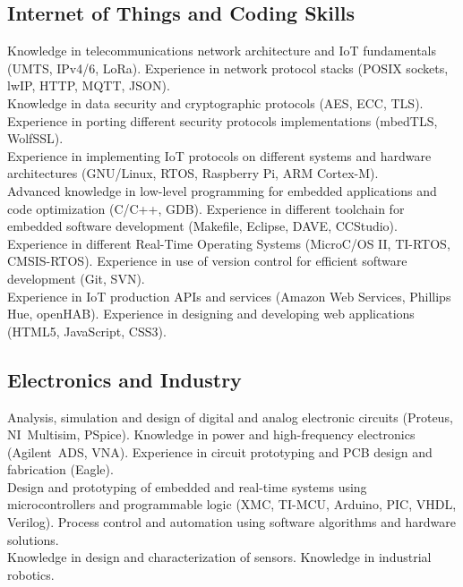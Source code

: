 \documentclass[11pt,a4paper,sans,spanish]{moderncv}
\begin{document}
\subsection{Internet of Things and Coding Skills}
Knowledge in telecommunications network architecture and IoT fundamentals (UMTS, IPv4/6, LoRa). Experience in network protocol stacks (POSIX sockets, lwIP, HTTP, MQTT, JSON).
\protect\\[0.4em]
Knowledge in data security and cryptographic protocols (AES, ECC, TLS). Experience in porting different security protocols implementations (mbedTLS, WolfSSL).
\protect\\[0.4em]
Experience in implementing IoT protocols on different systems and hardware architectures (GNU/Linux, RTOS, Raspberry Pi, ARM Cortex-M).
\protect\\[0.4em]
Advanced knowledge in low-level programming for embedded applications and code optimization (C/C++, GDB). Experience in different toolchain for embedded software development (Makefile, Eclipse, DAVE, CCStudio). Experience in different Real-Time Operating Systems (MicroC/OS II, TI-RTOS, CMSIS-RTOS). Experience in use of version control for efficient software development (Git, SVN).
\protect\\[0.4em]
Experience in IoT production APIs and services (Amazon Web Services, Phillips Hue, openHAB). Experience in designing and developing web applications (HTML5, JavaScript, CSS3).


\subsection{Electronics and Industry}
Analysis, simulation and design of digital and analog electronic circuits (Proteus, NI~Multisim, PSpice). Knowledge in power and high-frequency electronics (Agilent~ADS, VNA). Experience in circuit prototyping and PCB design and fabrication (Eagle).
\protect\\[0.4em]
Design and prototyping of embedded and real-time systems using microcontrollers and programmable logic (XMC, TI-MCU, Arduino, PIC, VHDL, Verilog).
Process control and automation using software algorithms and hardware solutions.
\protect\\[0.4em]
Knowledge in design and characterization of sensors. Knowledge in industrial robotics.
\end{document}
